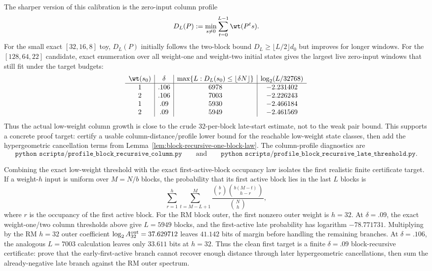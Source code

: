 The sharper version of this calibration is the zero-input column profile
\[
D_L(P):=\min_{s\ne0}\sum_{t=0}^{L-1}\wt(P^t s).
\]
For the small exact \([32,16,8]\) toy, \(D_L(P)\) initially follows the two-block bound \(D_L\ge\lfloor L/2\rfloor d_0\)
but improves for longer windows.  For the \([128,64,22]\) candidate, exact enumeration over all weight-one and
weight-two initial states gives the largest live zero-input windows that still fit under the target budgets:
\[
\begin{array}{c|c|c|c}
\wt(s_0) & \delta & \max\{L:D_L(s_0)\le \lfloor\delta N\rfloor\} & \log_2(L/32768)\\
\hline
1 & .106 & 6978 & -2.231402\\
2 & .106 & 7003 & -2.226243\\
1 & .09 & 5930 & -2.466184\\
2 & .09 & 5949 & -2.461569
\end{array}
\]
Thus the actual low-weight column growth is close to the crude \(32\)-per-block late-start estimate, not to the weak
pair bound.  This supports a concrete proof target: certify a usable column-distance/profile lower bound for the
reachable low-weight state classes, then add the hypergeometric cancellation terms from
Lemma~\ref{lem:block-recursive-one-block-law}.  The column-profile diagnostics are
\[
\texttt{python scripts/profile\_block\_recursive\_column.py}
\qquad\text{and}\qquad
\texttt{python scripts/profile\_block\_recursive\_late\_threshold.py}.
\]

Combining the exact low-weight threshold with the exact first-active-block occupancy law isolates the first realistic
finite certificate target.  If a weight-\(h\) input is uniform over \(M=N/b\) blocks, the probability that its first
active block lies in the last \(L\) blocks is
\[
\sum_{r=1}^h\sum_{t=M-L+1}^{M}
\frac{\binom{b}{r}\binom{b(M-t)}{h-r}}{\binom{N}{h}},
\]
where \(r\) is the occupancy of the first active block.  For the RM block outer, the first nonzero outer weight is
\(h=32\).  At \(\delta=.09\), the exact weight-one/two column thresholds above give \(L=5949\) blocks, and the
first-active late probability has logarithm \(-78.771731\).  Multiplying by the RM \(h=32\) outer coefficient
\(\log_2 A_{32}^{\rm out}=37.629712\) leaves \(41.142\) bits of margin before handling the remaining branches.
At \(\delta=.106\), the analogous \(L=7003\) calculation leaves only \(33.611\) bits at \(h=32\).  Thus the clean
first target is a finite \(\delta=.09\) block-recursive certificate: prove that the early-first-active branch cannot
recover enough distance through later hypergeometric cancellations, then sum the already-negative late branch against
the RM outer spectrum.

